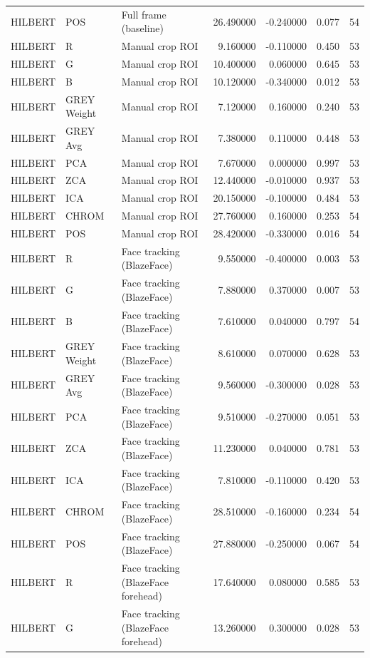 \begin{table}[htbp]
\begin{tabular}{l l l r r l r}
HILBERT & POS & Full frame (baseline) & 26.490000 & -0.240000 & 0.077 & 54 \\
HILBERT & R & Manual crop ROI & 9.160000 & -0.110000 & 0.450 & 53 \\
HILBERT & G & Manual crop ROI & 10.400000 & 0.060000 & 0.645 & 53 \\
HILBERT & B & Manual crop ROI & 10.120000 & -0.340000 & 0.012 & 53 \\
HILBERT & GREY Weight & Manual crop ROI & 7.120000 & 0.160000 & 0.240 & 53 \\
HILBERT & GREY Avg & Manual crop ROI & 7.380000 & 0.110000 & 0.448 & 53 \\
HILBERT & PCA & Manual crop ROI & 7.670000 & 0.000000 & 0.997 & 53 \\
HILBERT & ZCA & Manual crop ROI & 12.440000 & -0.010000 & 0.937 & 53 \\
HILBERT & ICA & Manual crop ROI & 20.150000 & -0.100000 & 0.484 & 53 \\
HILBERT & CHROM & Manual crop ROI & 27.760000 & 0.160000 & 0.253 & 54 \\
HILBERT & POS & Manual crop ROI & 28.420000 & -0.330000 & 0.016 & 54 \\
HILBERT & R & Face tracking (BlazeFace) & 9.550000 & -0.400000 & 0.003 & 53 \\
HILBERT & G & Face tracking (BlazeFace) & 7.880000 & 0.370000 & 0.007 & 53 \\
HILBERT & B & Face tracking (BlazeFace) & 7.610000 & 0.040000 & 0.797 & 54 \\
HILBERT & GREY Weight & Face tracking (BlazeFace) & 8.610000 & 0.070000 & 0.628 & 53 \\
HILBERT & GREY Avg & Face tracking (BlazeFace) & 9.560000 & -0.300000 & 0.028 & 53 \\
HILBERT & PCA & Face tracking (BlazeFace) & 9.510000 & -0.270000 & 0.051 & 53 \\
HILBERT & ZCA & Face tracking (BlazeFace) & 11.230000 & 0.040000 & 0.781 & 53 \\
HILBERT & ICA & Face tracking (BlazeFace) & 7.810000 & -0.110000 & 0.420 & 53 \\
HILBERT & CHROM & Face tracking (BlazeFace) & 28.510000 & -0.160000 & 0.234 & 54 \\
HILBERT & POS & Face tracking (BlazeFace) & 27.880000 & -0.250000 & 0.067 & 54 \\
HILBERT & R & Face tracking (BlazeFace forehead) & 17.640000 & 0.080000 & 0.585 & 53 \\
HILBERT & G & Face tracking (BlazeFace forehead) & 13.260000 & 0.300000 & 0.028 & 53 \\

\end{tabular}
\end{table}
